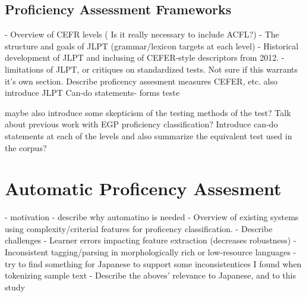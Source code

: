 \subsection{Proficiency Assessment Frameworks}
- Overview of CEFR levels ( Is it really necessary to include ACFL?)
- The structure and goals of JLPT (grammar/lexicon targets at each level)
- Historical development of JLPT and inclusing of CEFER-style descriptors from 2012.
- limitations of JLPT, or critiques on standardized tests.
Not sure if this warrants it's own section. Describe proficency assesment measures CEFER, etc. also introduce JLPT
Can-do statements- forms teste


maybe also introduce some skepticism of the testing methods of the test?
Talk about previous work with EGP proficiency classification?
Introduce can-do statements at each of the levels and also summarize the equivalent test used in the corpus?


\section{Automatic Proficency Assesment}
- motivation - describe why automatino is needed
- Overview of existing systems using complexity/criterial features for proficency classification.
- Describe challenges
    - Learner errors impacting feature extraction (decreases robustness)
    -Inconsistent tagging/parsing in morphologically rich or low-resource languages
        -try to find something for Japanese to support some inconsistentices I found when tokenizing sample text
- Describe the aboves' relevance to Japanese, and to this study


